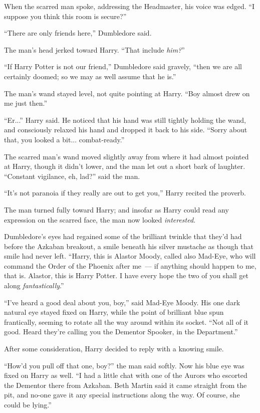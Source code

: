 When the scarred man spoke, addressing the Headmaster, his voice was edged. ``I suppose you think this room is secure?''

``There are only friends here,'' Dumbledore said.

The man's head jerked toward Harry. ``That include \emph{him?}''

``If Harry Potter is not our friend,'' Dumbledore said gravely, ``then we are all certainly doomed; so we may as well assume that he is.''

The man's wand stayed level, not quite pointing at Harry. ``Boy almost drew on me just then.''

``Er...'' Harry said. He noticed that his hand was still tightly holding the wand, and consciously relaxed his hand and dropped it back to his side. ``Sorry about that, you looked a bit... combat-ready.''

The scarred man's wand moved slightly away from where it had almost pointed at Harry, though it didn't lower, and the man let out a short bark of laughter. ``Constant vigilance, eh, lad?'' said the man.

``It's not paranoia if they really are out to get you,'' Harry recited the proverb.

The man turned fully toward Harry; and insofar as Harry could read any expression on the scarred face, the man now looked \emph{interested}.

Dumbledore's eyes had regained some of the brilliant twinkle that they'd had before the Azkaban breakout, a smile beneath his silver mustache as though that smile had never left. ``Harry, this is Alastor Moody, called also Mad-Eye, who will command the Order of the Phoenix after me~--- if anything should happen to me, that is. Alastor, this is Harry Potter. I have every hope the two of you shall get along \emph{fantastically}.''

``I've heard a good deal about you, boy,'' said Mad-Eye Moody. His one dark natural eye stayed fixed on Harry, while the point of brilliant blue spun frantically, seeming to rotate all the way around within its socket. ``Not all of it good. Heard they're calling you the Dementor Spooker, in the Department.''

After some consideration, Harry decided to reply with a knowing smile.

``How'd you pull off that one, boy?'' the man said softly. Now his blue eye was fixed on Harry as well. ``I had a little chat with one of the Aurors who escorted the Dementor there from Azkaban. Beth Martin said it came straight from the pit, and no-one gave it any special instructions along the way. Of course, she could be lying.''

